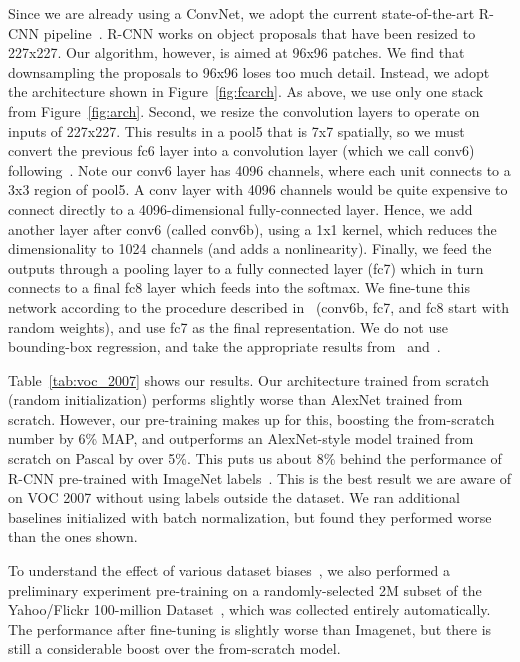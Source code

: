\documentclass[10pt,twocolumn,letterpaper]{article}
\begin{document}
Since we are already using a ConvNet, we adopt the current state-of-the-art R-CNN pipeline~\cite{girshick2014rich}.  R-CNN works on object proposals that have been resized to 227x227.  Our algorithm, however, is aimed at 96x96 patches.  We find that downsampling the proposals to 96x96 loses too much detail.
Instead, we adopt the architecture shown in Figure~\ref{fig:fcarch}.  As above, we use only one stack from Figure~\ref{fig:arch}.
Second, we resize the convolution layers to operate on inputs of 227x227.  This results in a pool5 that is 7x7 spatially, so we must convert the previous fc6 layer into a convolution layer  (which we call conv6) following~\cite{long2014fully}.  Note our conv6 layer has 4096 channels, where each unit connects to a 3x3 region of pool5.  A conv layer with 4096 channels would be quite expensive to connect directly to a 4096-dimensional fully-connected layer.  Hence, we add another layer after conv6 (called conv6b), using a 1x1 kernel, which reduces the dimensionality to 1024 channels (and adds a nonlinearity).   Finally, we feed the outputs through a pooling layer to a fully connected layer (fc7) which in turn connects to a final fc8 layer which feeds into the softmax.  We fine-tune this network according to the procedure described in~\cite{girshick2014rich} (conv6b, fc7, and fc8 start with random weights), and use fc7 as the final representation.  We do not use bounding-box regression, and take the appropriate results from~\cite{girshick2014rich} and~\cite{agrawal2014analyzing}.  



Table~\ref{tab:voc_2007} shows our results.  Our architecture trained from scratch (random initialization) performs slightly worse than AlexNet trained from scratch.  %
However, our pre-training makes up for this, boosting the from-scratch number by 6\% MAP, and outperforms an AlexNet-style model trained from scratch on Pascal by over 5\%.  This puts us about 8\% behind
the performance of R-CNN pre-trained with ImageNet labels~\cite{girshick2014rich}.  This is the best result we are aware of on VOC 2007 without using labels outside the dataset.  We ran additional baselines initialized with batch normalization, but found they performed worse than the ones shown.

To understand the effect of various dataset biases~\cite{torralba11}, we also performed a preliminary experiment pre-training on a randomly-selected 2M subset of the Yahoo/Flickr 100-million Dataset~\cite{thomee2015yfcc100m}, which was collected entirely automatically.  The performance after fine-tuning is slightly worse than Imagenet, but there is still a considerable boost over the from-scratch model. 
\end{document}
